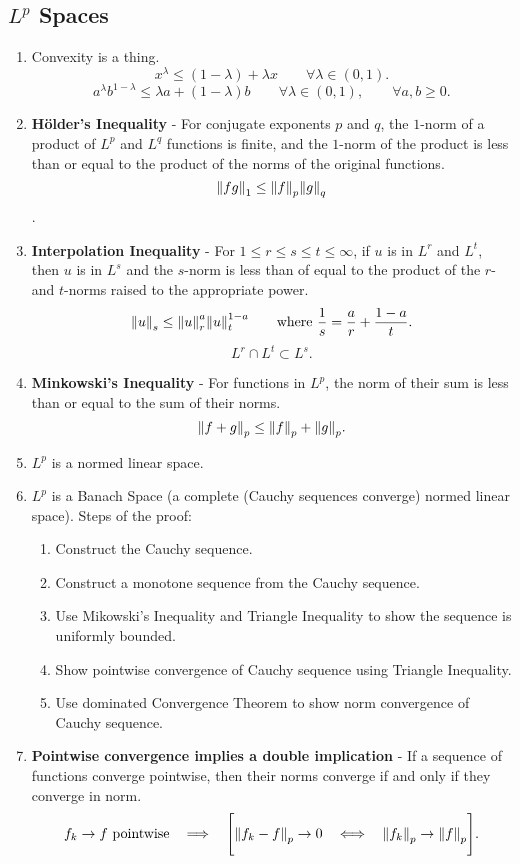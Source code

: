 \documentclass{article}
\begin{document}
    \subsection{$L^p$ Spaces}
    \begin{enumerate}
        \item Convexity is a thing.  $$x^\lambda \leq (1 - \lambda) + \lambda x \qquad \forall \lambda \in (0,1).$$ $$a^\lambda b^{1-\lambda} \leq \lambda a + (1 - \lambda)b \qquad \forall \lambda \in (0,1), \qquad \forall a,b \geq 0.$$
        \item \textbf{H\"{o}lder's Inequality} - For conjugate exponents $p$ and $q$, the $1$-norm of a product of $L^p$ and $L^q$ functions is finite, and the $1$-norm of the product is less than or equal to the product of the norms of the original functions.  $$\norm{fg}_1 \leq \norm{f}_p\norm{g}_q$$.
        \item \textbf{Interpolation Inequality} - For $1 \leq r \leq s \leq t \leq \infty$, if $u$ is in $L^r$ and $L^t$, then $u$ is in $L^s$ and the $s$-norm is less than of equal to the product of the $r$- and $t$-norms raised to the appropriate power. $$\norm{u}_s \leq \norm{u}_r^a \norm{u}_t^{1-a}\qquad \text{where } \frac{1}{s} = \frac{a}{r} + \frac{1-a}{t}.$$ $$L^r \cap L^t \subset L^s.$$
        \item \textbf{Minkowski's Inequality} - For functions in $L^p$, the norm of their sum is less than or equal to the sum of their norms. $$\norm{f + g}_p \leq \norm{f}_p + \norm{g}_p.$$
        \item $L^p$ is a normed linear space.
        \item $L^p$ is a Banach Space (a complete (Cauchy sequences converge) normed linear space).  Steps of the proof:
        \begin{enumerate}
            \item Construct the Cauchy sequence.
            \item Construct a monotone sequence from the Cauchy sequence.
            \item Use Mikowski's Inequality and Triangle Inequality to  show the sequence is uniformly bounded.
            \item Show pointwise convergence of Cauchy sequence using Triangle Inequality.
            \item Use dominated Convergence Theorem to show norm convergence of Cauchy sequence.
        \end{enumerate}
        \item \textbf{Pointwise convergence implies a double implication} - If a sequence of functions converge pointwise, then their norms converge if and only if they converge in norm. $$f_k \rightarrow f \text{ pointwise}\ \ \implies\ \ \Bigg[\norm{f_k - f}_p \rightarrow 0\ \ \iff\ \ \norm{f_k}_p \rightarrow \norm{f}_p\Bigg].$$

\end{enumerate}
\end{document}
